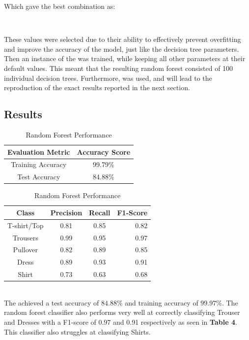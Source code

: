 Which gave the best combination as:\\

\begin{tcolorbox}[colback=white,
                  arc=0pt,
                outer=0pt]
\centering {} \, \,  \, \,  \, \, \\
   \end{tcolorbox}


These values were selected due to their ability to effectively prevent overfitting and improve the accuracy of the model, just like the decision tree parameters.
Then an instance of the  was trained, while keeping all other parameters at their default values.
This meant that the resulting random forest consisted of 100 individual decision trees.
Furthermore,  was used, and will lead to the reproduction of the exact results reported in the next section.

\subsection{Results}\label{subsec:results}
\begin{table}[!ht]
\begin{subtable}[c]{0.4\textwidth}
\footnotesize
\centering
\begin{tabular}{ c | c }
 \toprule
 Evaluation Metric & Accuracy Score  \\
 \midrule
 Training Accuracy &  99.79\% \\
 Test Accuracy & 84.88\% \\
 \bottomrule
\end{tabular}
\captionsetup{justification=centering,margin=1cm}
\end{subtable}
\begin{subtable}[c]{0.6\textwidth}
\footnotesize
\centering
\begin{tabular}{c | c c r}
Class & Precision & Recall & F1-Score\\
\midrule
T-shirt/Top   &    0.81  &    0.85  &    0.82 \\
Trousers   &    0.99  &    0.95  &    0.97 \\
Pullover   &    0.82  &    0.89  &    0.85\\
Dress   &    0.89  &    0.93  &    0.91\\
Shirt   &    0.73  &    0.63  &    0.68\\
\end{tabular}
\captionsetup{justification=centering,margin=1cm}
\end{subtable}
\caption{Random Forest Performance}
\label{tab:random_forest_evaluation}
\end{table}\\

The  achieved a test accuracy of $84.88\%$ and training accuracy of $99.97\%$.
The random forest classifier also performs very well at correctly classifying Trouser and Dresses with a F1-score of 0.97 and 0.91 respectively as seen in \textbf{Table 4}.
This classifier also struggles at classifying Shirts.
